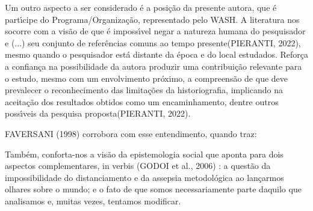 \documentclass[
12pt,		%
openright,	%
twoside,  %
a4paper,			%
chapter=TITLE,		%
english,			%
french,				%
spanish,			%
brazil				%
]{USPSC-classe/USPSC}
\begin{document}
Um outro aspecto a ser considerado \'e a posi\c{c}\~ao da presente autora, que \'e part\'{\i}cipe do Programa/Organiza\c{c}\~ao, representado pelo WASH. A literatura nos socorre com a vis\~ao de que \'e imposs\'{\i}vel \textquotedbl negar a natureza humana do pesquisador e (...) seu conjunto de refer\^encias comuns ao tempo presente\textquotedbl  (PIERANTI, 2022), mesmo quando o pesquisador est\'a \textquotedbl distante da \'epoca e do local estudados\textquotedbl . Refor\c{c}a a confian\c{c}a na possibilidade da autora produzir uma contribui\c{c}\~ao relevante para o  estudo, mesmo com um envolvimento pr\'oximo, a compreens\~ao de que \textquotedbl deve prevalecer o reconhecimento das limita\c{c}\~oes da historiografia, implicando na aceita\c{c}\~ao dos resultados obtidos como um encaminhamento, dentre outros poss\'{\i}veis da pesquisa proposta\textquotedbl  (PIERANTI, 2022).

















 FAVERSANI (1998) corrobora com esse entendimento, quando traz:


















\noindent\begin{center}\mbox{\centering{}}\end{center}


Tamb\'em, conforta-nos a vis\~ao da epistemologia social que aponta para dois aspectos complementares, in verbis  (GODOI et al., 2006) : \textquotedbl a quest\~ao da impossibilidade do distanciamento e da assepsia metodol\'ogica ao lan\c{c}armos olhares sobre o mundo; e o fato de que somos necessariamente parte daquilo que analisamos e, muitas vezes, tentamos modificar\textquotedbl .
\end{document}
